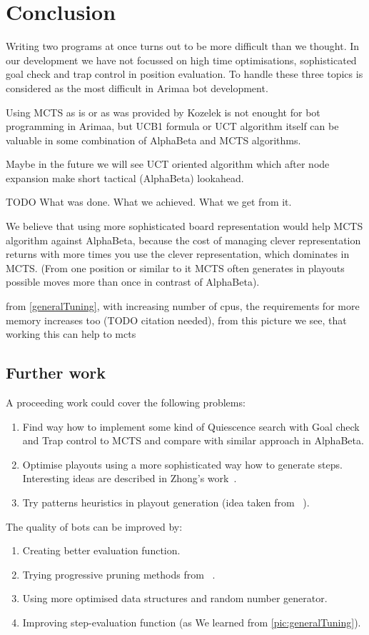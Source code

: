 \chapter{Conclusion}
Writing two programs at once turns out to be more difficult than we thought. In
our development we have not focussed on high time optimisations,
sophisticated goal check and trap control in position evaluation. To handle these three topics is considered as the most difficult in Arimaa bot development.

Using MCTS as is or as was provided by Kozelek is not enought for bot
programming in Arimaa, but UCB1 formula or UCT algorithm itself can be valuable
in some combination of AlphaBeta and MCTS algorithms.

Maybe in the future we will see UCT oriented algorithm which after node expansion make short tactical (AlphaBeta) lookahead.

TODO What was done. What we achieved. What we get from it.

We believe that using more sophisticated board representation would help MCTS
algorithm against AlphaBeta, because the cost of managing clever representation
returns with more times you use the clever representation, which dominates in
MCTS. (From one position or similar to it MCTS often generates in playouts
possible moves more than once in contrast of AlphaBeta).

from \ref{generalTuning}, with increasing number of cpus, the requirements for more memory increases too (TODO citation needed), from this picture we see, that working this can help to mcts


\section{Further work}

A proceeding work could cover the following problems:

\begin{enumerate}
\item Find way how to implement some kind of Quiescence search with Goal check and Trap control to MCTS and compare with similar approach in AlphaBeta.
\item Optimise playouts using a more sophisticated way how to generate steps. Interesting ideas are described in Zhong's work~\cite{ZHONG}.
\item Try patterns heuristics in playout generation (idea taken from ~\cite{PatternsGo,PatternsArimaa}).
\end{enumerate}

\noindent The quality of bots can be improved by:
\begin{enumerate}
\item Creating better evaluation function.
\item Trying progressive pruning methods from ~\cite{progressive-strategies,
MonteCarloGo}.
\item Using more optimised data structures and random number generator.
\item Improving step-evaluation function (as We learned from \ref{pic:generalTuning}).
\end{enumerate}
